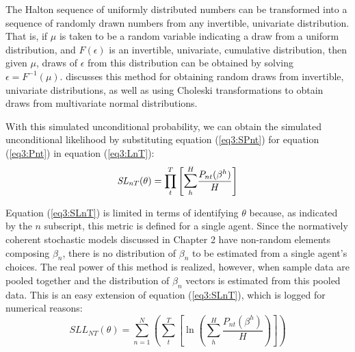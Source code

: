 \documentclass[../main.tex]{subfiles}
\begin{document}
\addtocounter{footnote}{-2}

The Halton sequence of uniformly distributed numbers can be transformed into a sequence of randomly drawn numbers from any invertible, univariate distribution.
That is, if $\mu$ is taken to be a random variable indicating a draw from a uniform distribution, and $F(\epsilon)$ is an invertible, univariate, cumulative distribution, then given $\mu$, draws of $\epsilon$ from this distribution can be obtained by solving $\epsilon = F^{-1}(\mu)$.
\textcite[236]{Train2002} discusses this method for obtaining random draws from invertible, univariate distributions, as well as using Choleski transformations to obtain draws from multivariate normal distributions.

With this simulated unconditional probability, we can obtain the simulated unconditional likelihood by substituting equation (\ref{eq3:SPnt}) for equation (\ref{eq3:Pnt}) in equation (\ref{eq3:LnT}):
\begin{equation}
	\label{eq3:SLnT}
	\mathit{SL}_{nT}(\theta) = \prod_t^T \left[ \mathlarger{\sum}_h^H \frac{ P_{nt}(\beta^h) }{H} \right]
\end{equation}

Equation (\ref{eq3:SLnT}) is limited in terms of identifying $\theta$ because, as indicated by the $n$ subscript, this metric is defined for a single agent.
Since the normatively coherent stochastic models discussed in Chapter 2 have non-random elements composing $\beta_n$, there is no distribution of $\beta_n$ to be estimated from a single agent's choices.
The real power of this method is realized, however, when sample data are pooled together and the distribution of $\beta_n$ vectors is estimated from this pooled data.
This is an easy extension of equation (\ref{eq3:SLnT}), which is logged for numerical reasons:
\begin{equation}
	\label{eq3:SLLNT}
	\mathit{SLL}_{NT}(\theta) = \sum_{n=1}^N \left( \sum_t^T \left[ \ln\!\left( \sum_h^H \frac{ P_{nt}(\beta^h) }{H} \right) \right] \right)
\end{equation}
\end{document}
